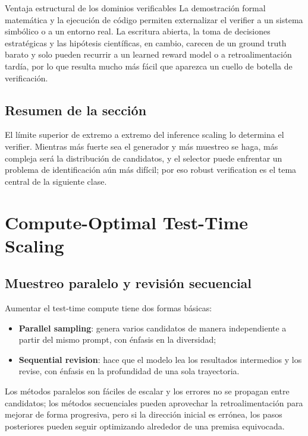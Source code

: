 \documentclass[a4paper]{article}
\begin{document}
\begin{knowledgebox}{Ventaja estructural de los dominios verificables}
La demostración formal matemática y la ejecución de código permiten externalizar el verifier a un sistema simbólico o a un entorno real. La escritura abierta, la toma de decisiones estratégicas y las hipótesis científicas, en cambio, carecen de un ground truth barato y solo pueden recurrir a un learned reward model o a retroalimentación tardía, por lo que resulta mucho más fácil que aparezca un cuello de botella de verificación.
\end{knowledgebox}

\subsection{Resumen de la sección}

El límite superior de extremo a extremo del inference scaling lo determina el verifier. Mientras más fuerte sea el generador y más muestreo se haga, más compleja será la distribución de candidatos, y el selector puede enfrentar un problema de identificación aún más difícil; por eso robust verification es el tema central de la siguiente clase.
\section{Compute-Optimal Test-Time Scaling}

\subsection{Muestreo paralelo y revisión secuencial}

Aumentar el test-time compute tiene dos formas básicas:

\begin{itemize}
    \item \textbf{Parallel sampling}: genera varios candidatos de manera independiente a partir del mismo prompt, con énfasis en la diversidad;
    \item \textbf{Sequential revision}: hace que el modelo lea los resultados intermedios y los revise, con énfasis en la profundidad de una sola trayectoria.
\end{itemize}


Los métodos paralelos son fáciles de escalar y los errores no se propagan entre candidatos; los métodos secuenciales pueden aprovechar la retroalimentación para mejorar de forma progresiva, pero si la dirección inicial es errónea, los pasos posteriores pueden seguir optimizando alrededor de una premisa equivocada.
\end{document}
